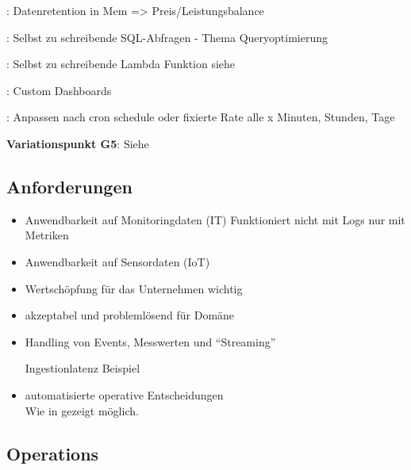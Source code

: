 :  Datenretention in Mem => Preis/Leistungsbalance

: Selbst zu schreibende \ac{SQL}-Abfragen - Thema Queryoptimierung

: Selbst zu schreibende Lambda Funktion siehe 

: Custom Dashboards

: Anpassen nach cron schedule oder fixierte Rate alle x Minuten, Stunden, Tage

\textbf{Variationspunkt G5}: Siehe 

\subsection{Anforderungen}
\begin{itemize}
\item Anwendbarkeit auf Monitoringdaten (IT)
Funktioniert nicht mit Logs nur mit Metriken

\item Anwendbarkeit auf Sensordaten (\ac{IoT})

\item Wertschöpfung für das Unternehmen wichtig

\item akzeptabel und problemlösend für Domäne

\item Handling von Events, Messwerten und \enquote{Streaming}

Ingestionlatenz Beispiel

\item automatisierte operative Entscheidungen\\
Wie in  gezeigt möglich.
\end{itemize}

\subsection{Operations}

